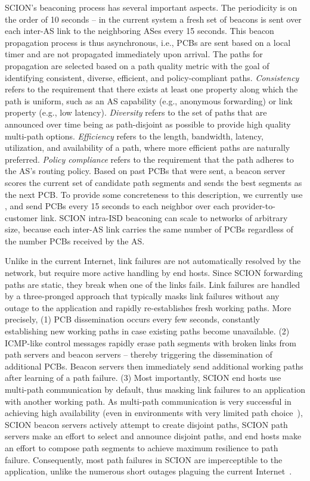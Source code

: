 \documentclass[a4paper]{llncs}
\newcommand\SCION{{\small\textsf{SCION}}\xspace}
\begin{document}
\SCION's beaconing process has several important aspects. The periodicity is on
the order of 10 seconds -- in the current system a fresh set of beacons is sent
over each inter-AS link to the neighboring ASes every 15 seconds. This beacon
propagation process is thus asynchronous, i.e., PCBs are sent based on a local
timer and are not propagated immediately upon arrival. The paths for propagation
are selected based on a path quality metric with the goal of identifying
consistent, diverse, efficient, and policy-compliant paths.  \emph{Consistency}
refers to the requirement that there exists at least one property along which
the path is uniform, such as an AS capability (e.g., anonymous forwarding) or link
property (e.g., low latency).
\emph{Diversity} refers to the set of paths that are announced over time being
as path-disjoint as possible to provide high quality multi-path options.
\emph{Efficiency} refers to the length, bandwidth, latency, utilization, and
availability of a path, where more efficient paths are naturally preferred.
\emph{Policy compliance} refers to the requirement that the path adheres to the
AS's routing policy.  Based on past PCBs that were sent, a beacon server scores
the current set of candidate path segments and sends the  best segments as the next PCB.
To provide some concreteness to this description, we currently use , and
send PCBs every 15 seconds to each neighbor over each provider-to-customer link.  \SCION
intra-ISD beaconing can scale to networks of arbitrary size, because each
inter-AS link carries the same number of PCBs regardless of the number PCBs
received by the AS.

Unlike in the current Internet, link failures are not automatically resolved by
the network, but require more active handling by end hosts.  Since \SCION
forwarding paths are static, they break when one of the links fails. Link
failures are handled by a three-pronged approach that typically masks link
failures without any outage to the application and rapidly re-establishes fresh
working paths. More precisely, 
(1) PCB dissemination occurs every few seconds, constantly establishing new working paths
in case existing paths become unavailable. 
(2) ICMP-like control messages rapidly erase path segments with broken links from path
servers and beacon servers -- thereby triggering the dissemination of additional
PCBs. Beacon servers then immediately send 
additional working paths after
learning of a path failure.  
(3) Most importantly, \SCION end hosts use multi-path communication by default,
thus masking link failures to an application with another working path.  As multi-path communication is very successful in achieving high
availability (even in environments with very limited path
choice~\cite{AnBaKaMo2001}), \SCION beacon servers actively attempt to create
disjoint paths, \SCION path servers make an effort to select and announce
disjoint paths, and end hosts make an effort to compose path segments to achieve
maximum resilience to path failure.  Consequently, most path failures in \SCION
are imperceptible to the application, unlike the numerous short outages plaguing
the current Internet~\cite{KusKanKat2007,KSCCVFMAK2012}.
\end{document}
